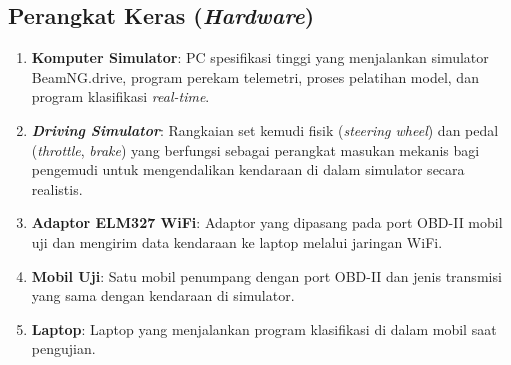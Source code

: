 \subsection{Perangkat Keras (\textit{Hardware})}
\begin{enumerate}[label=\arabic*)]
  \item \textbf{Komputer Simulator}: PC spesifikasi tinggi yang menjalankan simulator BeamNG.drive, program perekam telemetri, proses pelatihan model, dan program klasifikasi \textit{real-time}.
  \item \textbf{\textit{Driving Simulator}}: Rangkaian set kemudi fisik (\textit{steering wheel}) dan pedal (\textit{throttle}, \textit{brake}) yang berfungsi sebagai perangkat masukan mekanis bagi pengemudi untuk mengendalikan kendaraan di dalam simulator secara realistis.
  \item \textbf{Adaptor ELM327 WiFi}: Adaptor yang dipasang pada port OBD-II mobil uji dan mengirim data kendaraan ke laptop melalui jaringan WiFi.
  \item \textbf{Mobil Uji}: Satu mobil penumpang dengan port OBD-II dan jenis transmisi yang sama dengan kendaraan di simulator.
  \item \textbf{Laptop}: Laptop yang menjalankan program klasifikasi di dalam mobil saat pengujian.
\end{enumerate}

